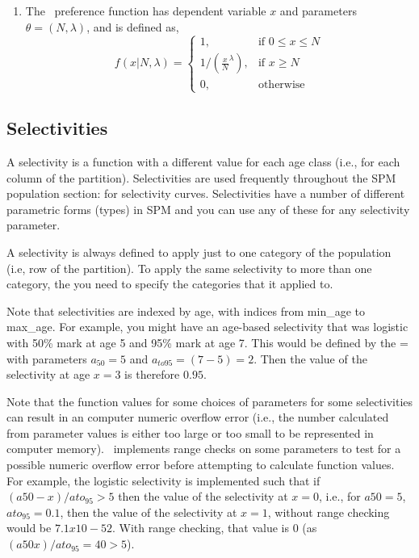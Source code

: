 \begin{enumerate}
\item The \ preference function has dependent variable $x$ and parameters $\theta = (N,\lambda)$, and is defined as,
\begin{equation}
  f(x | N, \lambda) = \begin{cases}
    1, & \text{if $0 \le x \leq N$} \\
    1/\left({\frac{x}{N}}^\lambda\right), & \text{if $x \ge N$}\\
    0, & \text{otherwise}
  \end{cases}
\end{equation}

\end{enumerate}

\subsection{Selectivities\label{sec:selectivities}}

A selectivity is a function with a different value for each age class (i.e., for each column of the partition). Selectivities are used frequently throughout the SPM population section: for selectivity curves. Selectivities have a number of different parametric forms (types) in SPM and you can use any of these for any selectivity parameter. 

A selectivity is always defined to apply just to one category of the population (i.e, row of the partition). To apply the same selectivity to more than one category, the you need to specify the categories that it applied to.

Note that selectivities are indexed by age, with indices from min\_age to max\_age. For example, you might have an age-based selectivity that was logistic with 50\% mark at age 5 and 95\% mark at age 7. This would be defined by the = with parameters $a_{50}=5$ and $a_{to95}=(7-5)=2$. Then the value of the selectivity at age $x=3$ is therefore $0.95$.

Note that the function values for some choices of parameters for some selectivities can result in an computer numeric overflow error (i.e., the number calculated from parameter values is either too large or too small to be represented in computer memory). \SPM\ implements range checks on some parameters to test for a possible numeric overflow error before attempting to calculate function values. For example, the logistic selectivity is implemented such that if $(a50-x)/ato_95 > 5$ then the value of the selectivity at $x=0$, i.e., for $a50=5$, $ato_95=0.1$, then the value of the selectivity at $x=1$, without range checking would be $7.1x10-52$. With range checking, that value is $0$ (as $(a50 x)/ato_95=40 > 5$).

